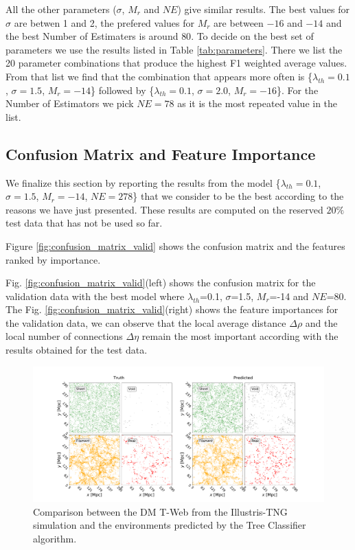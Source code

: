 \documentclass[usenatbib]{mnras}
\begin{document}
All the other parameters ($\sigma$, $M_r$ and $NE$) give similar
results. 
The best values for $\sigma$ are betwen 1 and 2, the prefered values
for $M_r$ are between $-16$ and $-14$ and the best Number of
Estimaters is around $80$.
To decide on the best set of parameters we use the results listed in
Table \ref{tab:parameters}.
There we list the 20 parameter combinations that
produce the highest F1 weighted average values.
From that list we find that the combination that appears more often is 
\{$\lambda_{th}=0.1$, $\sigma=1.5$, $M_r=-14$\} followed by 
\{$\lambda_{th}=0.1$, $\sigma=2.0$, $M_r=-16$\}.
For the Number of Estimators we pick $NE=78$ as it is the most
repeated value in the list.

\subsection{Confusion Matrix and Feature Importance}

We finalize this section by reporting the results from the model 
\{$\lambda_{th}=0.1$, $\sigma=1.5$, $M_r=-14$, $NE=278$\} that we
consider to be the best according to the reasons we have just
presented.
These results are computed on the reserved $20\%$ test data that has
not be used so far.

Figure \ref{fig:confusion_matrix_valid} shows the confusion matrix and
the features ranked by importance.

Fig. \ref{fig:confusion_matrix_valid}(left) shows the confusion matrix
for the validation data with the best model where $\lambda_{th}$=0.1,
$\sigma$=1.5, $M_r$=-14 and $NE$=80. The
Fig. \ref{fig:confusion_matrix_valid}(right) shows the feature
importances for the validation data, we can observe that the local
average distance $\Delta \rho$ and the local number of connections
$\Delta \eta$ remain the most important according with the results
obtained for the test data. 

\begin{figure}
  \centering 
    \includegraphics[scale=0.25]{Figs/p_environment_predicted.pdf}
    \caption{Comparison between the DM T-Web from the Illustris-TNG
      simulation and the environments predicted by the Tree Classifier
      algorithm.} 
    \label{fig:prediction}
\end{figure}
\end{document}
